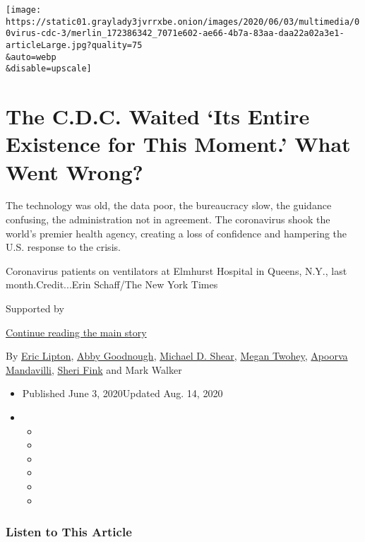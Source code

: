\texttt{[image: https://static01.graylady3jvrrxbe.onion/images/2020/06/03/multimedia/00virus-cdc-3/merlin\_172386342\_7071e602-ae66-4b7a-83aa-daa22a02a3e1-articleLarge.jpg?quality=75\\\&auto=webp\\\&disable=upscale]}

\hypertarget{the-cdc-waited-its-entire-existence-for-this-moment-what-went-wrong}{%
\section{The C.D.C. Waited `Its Entire Existence for This Moment.' What
Went
Wrong?}\label{the-cdc-waited-its-entire-existence-for-this-moment-what-went-wrong}}

The technology was old, the data poor, the bureaucracy slow, the
guidance confusing, the administration not in agreement. The coronavirus
shook the world's premier health agency, creating a loss of confidence
and hampering the U.S. response to the crisis.

Coronavirus patients on ventilators at Elmhurst Hospital in Queens,
N.Y., last month.Credit...Erin Schaff/The New York Times

Supported by

\protect\hyperlink{after-sponsor}{Continue reading the main story}

By \href{https://www.nytimes3xbfgragh.onion/by/eric-lipton}{Eric
Lipton},
\href{https://www.nytimes3xbfgragh.onion/by/abby-goodnough}{Abby
Goodnough},
\href{https://www.nytimes3xbfgragh.onion/by/michael-d-shear}{Michael D.
Shear}, \href{https://www.nytimes3xbfgragh.onion/by/megan-twohey}{Megan
Twohey},
\href{https://www.nytimes3xbfgragh.onion/by/apoorva-mandavilli}{Apoorva
Mandavilli},
\href{https://www.nytimes3xbfgragh.onion/by/sheri-fink}{Sheri Fink} and
Mark Walker

\begin{itemize}
\item
  Published June 3, 2020Updated Aug. 14, 2020
\item
  \begin{itemize}
  \item
  \item
  \item
  \item
  \item
  \item
  \end{itemize}
\end{itemize}

\hypertarget{listen-to-this-article}{%
\subsubsection{Listen to This Article}\label{listen-to-this-article}}

